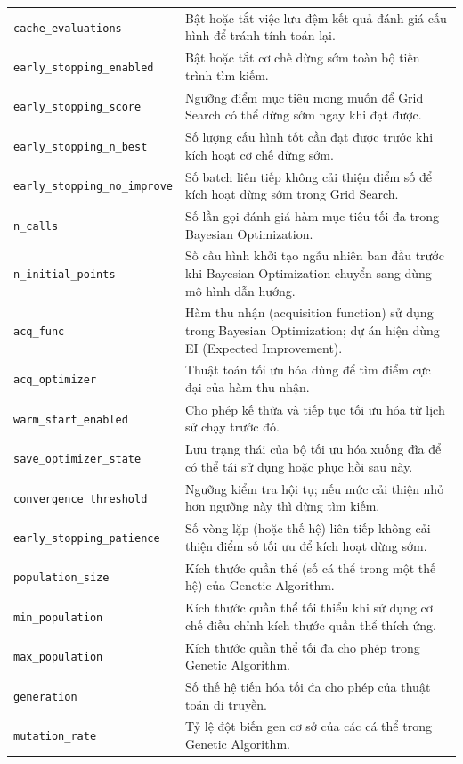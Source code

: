 \documentclass[12pt,a4paper]{article}
\begin{document}
\begin{longtable}{p{} p{}}
\texttt{cache\_evaluations} & Bật hoặc tắt việc lưu đệm kết quả đánh giá cấu hình để tránh tính toán lại. \\
\texttt{early\_stopping\_enabled} & Bật hoặc tắt cơ chế dừng sớm toàn bộ tiến trình tìm kiếm. \\
\texttt{early\_stopping\_score} & Ngưỡng điểm mục tiêu mong muốn để Grid Search có thể dừng sớm ngay khi đạt được. \\
\texttt{early\_stopping\_n\_best} & Số lượng cấu hình tốt cần đạt được trước khi kích hoạt cơ chế dừng sớm. \\
\texttt{early\_stopping\_no\_improve} & Số batch liên tiếp không cải thiện điểm số để kích hoạt dừng sớm trong Grid Search. \\
\texttt{n\_calls} & Số lần gọi đánh giá hàm mục tiêu tối đa trong Bayesian Optimization. \\
\texttt{n\_initial\_points} & Số cấu hình khởi tạo ngẫu nhiên ban đầu trước khi Bayesian Optimization chuyển sang dùng mô hình dẫn hướng. \\
\texttt{acq\_func} & Hàm thu nhận (acquisition function) sử dụng trong Bayesian Optimization; dự án hiện dùng EI (Expected Improvement). \\
\texttt{acq\_optimizer} & Thuật toán tối ưu hóa dùng để tìm điểm cực đại của hàm thu nhận. \\
\texttt{warm\_start\_enabled} & Cho phép kế thừa và tiếp tục tối ưu hóa từ lịch sử chạy trước đó. \\
\texttt{save\_optimizer\_state} & Lưu trạng thái của bộ tối ưu hóa xuống đĩa để có thể tái sử dụng hoặc phục hồi sau này. \\
\texttt{convergence\_threshold} & Ngưỡng kiểm tra hội tụ; nếu mức cải thiện nhỏ hơn ngưỡng này thì dừng tìm kiếm. \\
\texttt{early\_stopping\_patience} & Số vòng lặp (hoặc thế hệ) liên tiếp không cải thiện điểm số tối ưu để kích hoạt dừng sớm. \\
\texttt{population\_size} & Kích thước quần thể (số cá thể trong một thế hệ) của Genetic Algorithm. \\
\texttt{min\_population} & Kích thước quần thể tối thiểu khi sử dụng cơ chế điều chỉnh kích thước quần thể thích ứng. \\
\texttt{max\_population} & Kích thước quần thể tối đa cho phép trong Genetic Algorithm. \\
\texttt{generation} & Số thế hệ tiến hóa tối đa cho phép của thuật toán di truyền. \\
\texttt{mutation\_rate} & Tỷ lệ đột biến gen cơ sở của các cá thể trong Genetic Algorithm. \\

\end{longtable}
\end{document}
